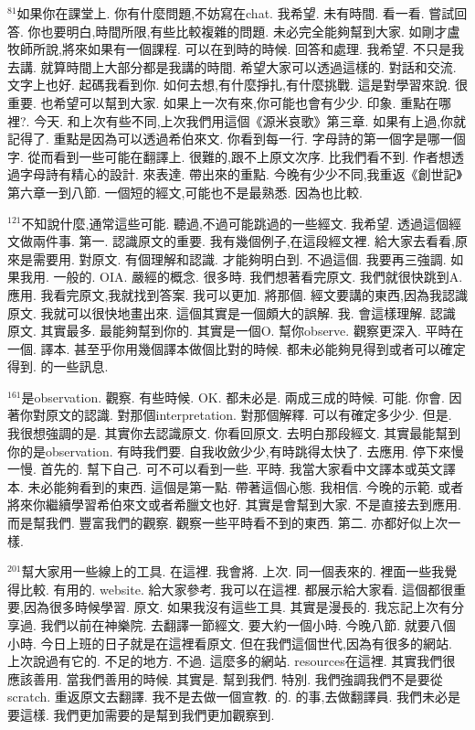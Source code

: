 \documentclass{book}
\begin{document}
$^{81}$如果你在課堂上.
你有什麼問題,不妨寫在chat.
我希望.
未有時間.
看一看.
嘗試回答.
你也要明白,時間所限,有些比較複雜的問題.
未必完全能夠幫到大家.
如剛才盧牧師所說,將來如果有一個課程.
可以在到時的時候.
回答和處理.
我希望.
不只是我去講.
就算時間上大部分都是我講的時間.
希望大家可以透過這樣的.
對話和交流.
文字上也好.
起碼我看到你.
如何去想,有什麼掙扎,有什麼挑戰.
這是對學習來說.
很重要.
也希望可以幫到大家.
如果上一次有來,你可能也會有少少.
印象.
重點在哪裡?.
今天.
和上次有些不同,上次我們用這個《源米哀歌》第三章.
如果有上過,你就記得了.
重點是因為可以透過希伯來文.
你看到每一行.
字母詩的第一個字是哪一個字.
從而看到一些可能在翻譯上.
很難的,跟不上原文次序.
比我們看不到.
作者想透過字母詩有精心的設計.
來表達.
帶出來的重點.
今晚有少少不同,我重返《創世記》第六章一到八節.
一個短的經文,可能也不是最熟悉.
因為也比較.

$^{121}$不知說什麼,通常這些可能.
聽過,不過可能跳過的一些經文.
我希望.
透過這個經文做兩件事.
第一.
認識原文的重要.
我有幾個例子,在這段經文裡.
給大家去看看,原來是需要用.
對原文.
有個理解和認識.
才能夠明白到.
不過這個.
我要再三強調.
如果我用.
一般的.
OIA.
嚴經的概念.
很多時.
我們想著看完原文.
我們就很快跳到A.
應用.
我看完原文,我就找到答案.
我可以更加.
將那個.
經文要講的東西,因為我認識原文.
我就可以很快地畫出來.
這個其實是一個頗大的誤解.
我.
會這樣理解.
認識原文.
其實最多.
最能夠幫到你的.
其實是一個O.
幫你observe.
觀察更深入.
平時在一個.
譯本.
甚至乎你用幾個譯本做個比對的時候.
都未必能夠見得到或者可以確定得到.
的一些訊息.

$^{161}$是observation.
觀察.
有些時候.
OK.
都未必是.
兩成三成的時候.
可能.
你會.
因著你對原文的認識.
對那個interpretation.
對那個解釋.
可以有確定多少少.
但是.
我很想強調的是.
其實你去認識原文.
你看回原文.
去明白那段經文.
其實最能幫到你的是observation.
有時我們要.
自我收斂少少,有時跳得太快了.
去應用.
停下來慢一慢.
首先的.
幫下自己.
可不可以看到一些.
平時.
我當大家看中文譯本或英文譯本.
未必能夠看到的東西.
這個是第一點.
帶著這個心態.
我相信.
今晚的示範.
或者將來你繼續學習希伯來文或者希臘文也好.
其實是會幫到大家.
不是直接去到應用.
而是幫我們.
豐富我們的觀察.
觀察一些平時看不到的東西.
第二.
亦都好似上次一樣.

$^{201}$幫大家用一些線上的工具.
在這裡.
我會將.
上次.
同一個表來的.
裡面一些我覺得比較.
有用的.
website.
給大家參考.
我可以在這裡.
都展示給大家看.
這個都很重要,因為很多時候學習.
原文.
如果我沒有這些工具.
其實是漫長的.
我忘記上次有分享過.
我們以前在神樂院.
去翻譯一節經文.
要大約一個小時.
今晚八節.
就要八個小時.
今日上班的日子就是在這裡看原文.
但在我們這個世代,因為有很多的網站.
上次說過有它的.
不足的地方.
不過.
這麼多的網站.
resources在這裡.
其實我們很應該善用.
當我們善用的時候.
其實是.
幫到我們.
特別.
我們強調我們不是要從 scratch.
重返原文去翻譯.
我不是去做一個宣教.
的.
的事,去做翻譯員.
我們未必是要這樣.
我們更加需要的是幫到我們更加觀察到.
\end{document}
